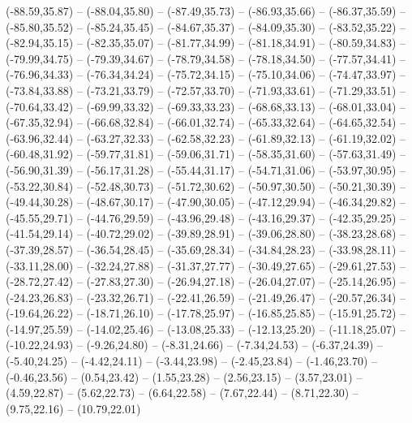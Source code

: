 {  (-88.59,35.87) -- (-88.04,35.80) -- (-87.49,35.73) -- (-86.93,35.66) -- (-86.37,35.59) -- (-85.80,35.52) -- (-85.24,35.45) --
  (-84.67,35.37) -- (-84.09,35.30) -- (-83.52,35.22) -- (-82.94,35.15) -- (-82.35,35.07) -- (-81.77,34.99) -- (-81.18,34.91) --
  (-80.59,34.83) -- (-79.99,34.75) -- (-79.39,34.67) -- (-78.79,34.58) -- (-78.18,34.50) -- (-77.57,34.41) -- (-76.96,34.33) --
  (-76.34,34.24) -- (-75.72,34.15) -- (-75.10,34.06) -- (-74.47,33.97) -- (-73.84,33.88) -- (-73.21,33.79) -- (-72.57,33.70) --
  (-71.93,33.61) -- (-71.29,33.51) -- (-70.64,33.42) -- (-69.99,33.32) -- (-69.33,33.23) -- (-68.68,33.13) -- (-68.01,33.04) --
  (-67.35,32.94) -- (-66.68,32.84) -- (-66.01,32.74) -- (-65.33,32.64) -- (-64.65,32.54) -- (-63.96,32.44) -- (-63.27,32.33) --
  (-62.58,32.23) -- (-61.89,32.13) -- (-61.19,32.02) -- (-60.48,31.92) -- (-59.77,31.81) -- (-59.06,31.71) -- (-58.35,31.60) --
  (-57.63,31.49) -- (-56.90,31.39) -- (-56.17,31.28) -- (-55.44,31.17) -- (-54.71,31.06) -- (-53.97,30.95) -- (-53.22,30.84) --
  (-52.48,30.73) -- (-51.72,30.62) -- (-50.97,30.50) -- (-50.21,30.39) -- (-49.44,30.28) -- (-48.67,30.17) -- (-47.90,30.05) --
  (-47.12,29.94) -- (-46.34,29.82) -- (-45.55,29.71) -- (-44.76,29.59) -- (-43.96,29.48) -- (-43.16,29.37) -- (-42.35,29.25) --
  (-41.54,29.14) -- (-40.72,29.02) -- (-39.89,28.91) -- (-39.06,28.80) -- (-38.23,28.68) -- (-37.39,28.57) -- (-36.54,28.45) --
  (-35.69,28.34) -- (-34.84,28.23) -- (-33.98,28.11) -- (-33.11,28.00) -- (-32.24,27.88) -- (-31.37,27.77) -- (-30.49,27.65) --
  (-29.61,27.53) -- (-28.72,27.42) -- (-27.83,27.30) -- (-26.94,27.18) -- (-26.04,27.07) -- (-25.14,26.95) -- (-24.23,26.83) --
  (-23.32,26.71) -- (-22.41,26.59) -- (-21.49,26.47) -- (-20.57,26.34) -- (-19.64,26.22) -- (-18.71,26.10) -- (-17.78,25.97) --
  (-16.85,25.85) -- (-15.91,25.72) -- (-14.97,25.59) -- (-14.02,25.46) -- (-13.08,25.33) -- (-12.13,25.20) -- (-11.18,25.07) --
  (-10.22,24.93) -- (-9.26,24.80) -- (-8.31,24.66) -- (-7.34,24.53) -- (-6.37,24.39) -- (-5.40,24.25) -- (-4.42,24.11) --
  (-3.44,23.98) -- (-2.45,23.84) -- (-1.46,23.70) -- (-0.46,23.56) -- (0.54,23.42) -- (1.55,23.28) -- (2.56,23.15) --
  (3.57,23.01) -- (4.59,22.87) -- (5.62,22.73) -- (6.64,22.58) -- (7.67,22.44) -- (8.71,22.30) -- (9.75,22.16) --
  (10.79,22.01)}
